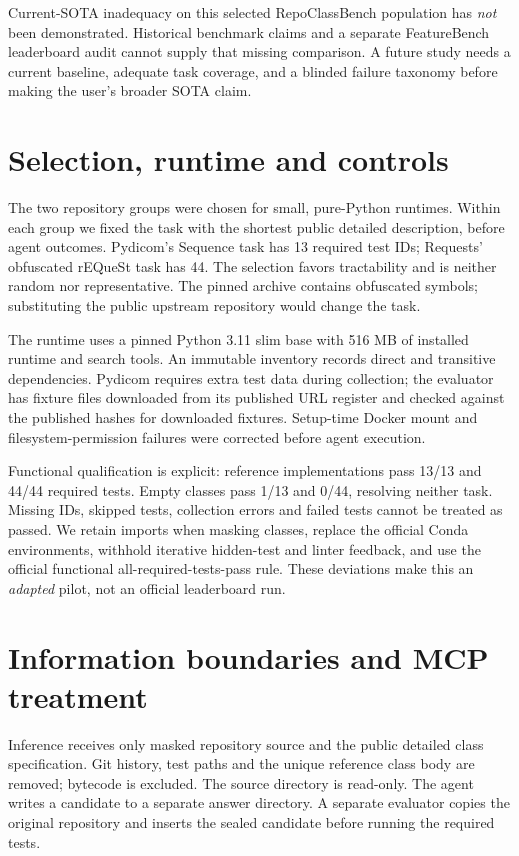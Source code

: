 \documentclass[11pt]{article}
\begin{document}
Current-SOTA inadequacy on this selected RepoClassBench population has \emph{not} been demonstrated. Historical benchmark claims and a separate FeatureBench leaderboard audit cannot supply that missing comparison. A future study needs a current baseline, adequate task coverage, and a blinded failure taxonomy before making the user's broader SOTA claim.

\section{Selection, runtime and controls}
The two repository groups were chosen for small, pure-Python runtimes. Within each group we fixed the task with the shortest public detailed description, before agent outcomes. Pydicom's Sequence task has 13 required test IDs; Requests' obfuscated rEQueSt task has 44. The selection favors tractability and is neither random nor representative. The pinned archive contains obfuscated symbols; substituting the public upstream repository would change the task.

The runtime uses a pinned Python 3.11 slim base with 516 MB of installed runtime and search tools. An immutable inventory records direct and transitive dependencies. Pydicom requires extra test data during collection; the evaluator has fixture files downloaded from its published URL register and checked against the published hashes for downloaded fixtures. Setup-time Docker mount and filesystem-permission failures were corrected before agent execution.

Functional qualification is explicit: reference implementations pass 13/13 and 44/44 required tests. Empty classes pass 1/13 and 0/44, resolving neither task. Missing IDs, skipped tests, collection errors and failed tests cannot be treated as passed. We retain imports when masking classes, replace the official Conda environments, withhold iterative hidden-test and linter feedback, and use the official functional all-required-tests-pass rule. These deviations make this an \emph{adapted} pilot, not an official leaderboard run.

\section{Information boundaries and MCP treatment}
Inference receives only masked repository source and the public detailed class specification. Git history, test paths and the unique reference class body are removed; bytecode is excluded. The source directory is read-only. The agent writes a candidate to a separate answer directory. A separate evaluator copies the original repository and inserts the sealed candidate before running the required tests.
\end{document}
